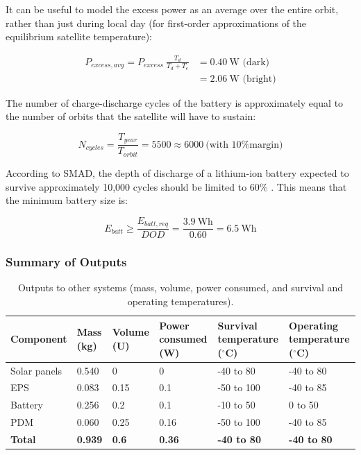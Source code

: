 \documentclass[12pt]{article}
\begin{document}
It can be useful to model the excess power as an average over the entire orbit, rather than just during local day (for first-order approximations of the equilibrium satellite temperature):

\begin{align}
P_{excess,avg} = P_{excess} \: \frac{T_d}{T_d + T_e} &= 0.40 \ \text{W (dark)}\\\nonumber
& = 2.06 \ \text{W (bright)}
\label{eq:power-excess-avg}
\end{align}

The number of charge-discharge cycles of the battery is approximately equal to the number of orbits that the satellite will have to sustain:

\begin{equation}
N_{cycles} = \frac{T_{year}}{T_{orbit}} = 5500 \approx 6000 \ \text{(with 10\% margin)}
\label{eq:power-num-cycles}
\end{equation}

According to SMAD, the depth of discharge of a lithium-ion battery expected to survive approximately 10,000 cycles should be limited to 60\% \cite[p.~651,~Fig.~21-16]{SMAD}.  This means that the minimum battery size is:

\begin{equation}
E_{batt} \geq \frac{E_{batt,req}}{DOD} = \frac{3.9 \ \text{Wh}}{0.60} = 6.5 \ \text{Wh}
\label{eq:power-batt-size}
\end{equation}

			\subsubsection{Summary of Outputs}
			
			

\begin{table}[ht]
\caption{Outputs to other systems (mass, volume, power consumed, and survival and operating temperatures).\cite[p.~9]{EPS-manual}\cite[p.~11,~21]{PDM-manual}\cite[p.~9]{Battery-manual}\cite[p.~2]{Solar-panel-datasheet}}
\label{tab:power-outputs}
\begin{center}
    \begin{tabular}{|l|p{0.55in}|p{0.65in}|p{0.9in}|p{1.1in}|p{1.3in}|} \hline
\textbf{Component} & \textbf{Mass} (kg) & \textbf{Volume} (U) & \textbf{Power consumed} (W) & \textbf{Survival temperature} ($^\circ$C) & \textbf{Operating temperature} ($^\circ$C) \\ \hline \hline
Solar panels & 0.540 & 0 & 0 & -40 to 80 & -40 to 80 \\\hline
EPS & 0.083 & 0.15 & 0.1 & -50 to 100 & -40 to 85 \\\hline
Battery & 0.256 & 0.2 & 0.1 & -10 to 50 & 0 to 50 \\\hline
PDM & 0.060 & 0.25 & 0.16 & -50 to 100 & -40 to 85 \\\hline \hline
\textbf{Total} & \textbf{0.939} & \textbf{0.6} & \textbf{0.36} & \textbf{-40 to 80} & \textbf{-40 to 80} \\\hline
    \end{tabular}
\end{center}
\end{table}
\end{document}
